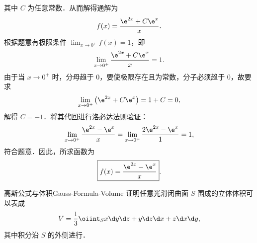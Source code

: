 \begin{solution}
    其中 $C$ 为任意常数．从而解得通解为
    \begin{equation}
        \label{eq:general-sol}
        f(x) = \frac{\e^{2x} + C \e^x}{x}.
    \end{equation}
    根据题意有极限条件 $\lim_{x \to 0^+} f(x) = 1$，即
    \begin{equation}
        \label{eq:limit-cond}
        \lim_{x \to 0^+} \frac{\e^{2x} + C \e^x}{x} = 1.
    \end{equation}
    由于当 $x \to 0^+$ 时，分母趋于 $0$，要使极限存在且为常数，分子必须趋于 $0$，故要求
    \begin{equation}
        \label{eq:limit-numerator}
        \lim_{x \to 0^+} \left( \e^{2x} + C \e^x \right) = 1 + C = 0,
    \end{equation}
    解得 $C = -1$．将其代回进行洛必达法则验证：
    \begin{equation}
        \label{eq:limit-verify}
        \lim_{x \to 0^+} \frac{\e^{2x} - \e^x}{x} = \lim_{x \to 0^+} \frac{2\e^{2x} - \e^x}{1} = 1,
    \end{equation}
    符合题意．因此，所求函数为
    \begin{equation}
        \label{eq:final-ans}
        \boxed{f(x) = \frac{\e^{2x} - \e^x}{x}}.
    \end{equation}
\end{solution}

\begin{problem}{高斯公式与体积}{Gauss-Formula-Volume}
    证明任意光滑闭曲面 $S$ 围成的立体体积可以表成
    \begin{equation}
        V = \frac{1}{3} \oiint_S x \d y \d z + y \d z \d x + z \d x \d y,
    \end{equation}
    其中积分沿 $S$ 的外侧进行．
\end{problem}

